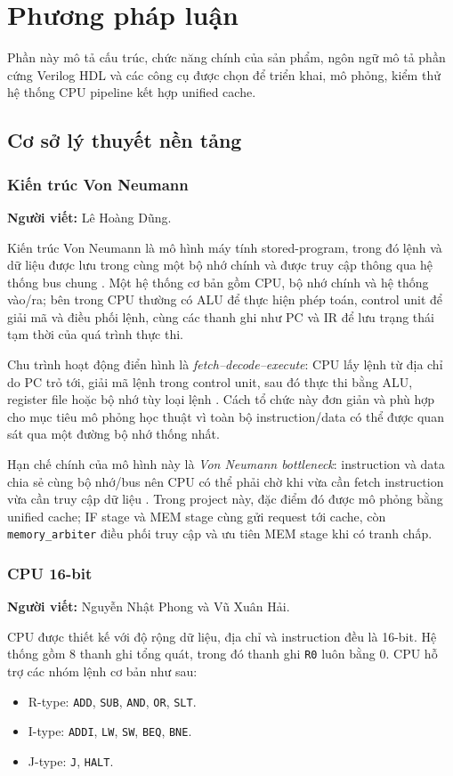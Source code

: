 \documentclass[11pt,a4paper]{article}
\theoremstyle{definition}
\theoremstyle{remark}
\begin{document}
	\section{Phương pháp luận}
	Phần này mô tả cấu trúc, chức năng chính của sản phẩm, ngôn ngữ mô tả phần cứng Verilog HDL và các công cụ được chọn để triển khai, mô phỏng, kiểm thử hệ thống CPU pipeline kết hợp unified cache.
	\subsection{Cơ sở lý thuyết nền tảng}
	
	\subsubsection{Kiến trúc Von Neumann}
	\textbf{Người viết:} Lê Hoàng Dũng.
	
	Kiến trúc Von Neumann là mô hình máy tính stored-program, trong đó lệnh và dữ liệu được lưu trong cùng một bộ nhớ chính và được truy cập thông qua hệ thống bus chung \cite{vonneumann,patterson}. Một hệ thống cơ bản gồm CPU, bộ nhớ chính và hệ thống vào/ra; bên trong CPU thường có ALU để thực hiện phép toán, control unit để giải mã và điều phối lệnh, cùng các thanh ghi như PC và IR để lưu trạng thái tạm thời của quá trình thực thi.
	
	Chu trình hoạt động điển hình là \textit{fetch--decode--execute}: CPU lấy lệnh từ địa chỉ do PC trỏ tới, giải mã lệnh trong control unit, sau đó thực thi bằng ALU, register file hoặc bộ nhớ tùy loại lệnh \cite{patterson}. Cách tổ chức này đơn giản và phù hợp cho mục tiêu mô phỏng học thuật vì toàn bộ instruction/data có thể được quan sát qua một đường bộ nhớ thống nhất.
	
	Hạn chế chính của mô hình này là \textit{Von Neumann bottleneck}: instruction và data chia sẻ cùng bộ nhớ/bus nên CPU có thể phải chờ khi vừa cần fetch instruction vừa cần truy cập dữ liệu \cite{hennessy}. Trong project này, đặc điểm đó được mô phỏng bằng unified cache; IF stage và MEM stage cùng gửi request tới cache, còn \texttt{memory\_arbiter} điều phối truy cập và ưu tiên MEM stage khi có tranh chấp.
	
	\subsubsection{CPU 16-bit}
	\textbf{Người viết:} Nguyễn Nhật Phong và Vũ Xuân Hải.
	
	CPU được thiết kế với độ rộng dữ liệu, địa chỉ và instruction đều là 16-bit. Hệ thống gồm 8 thanh ghi tổng quát, trong đó thanh ghi \texttt{R0} luôn bằng 0. CPU hỗ trợ các nhóm lệnh cơ bản như sau:
	\begin{itemize}
		\item R-type: \texttt{ADD}, \texttt{SUB}, \texttt{AND}, \texttt{OR}, \texttt{SLT}.
		\item I-type: \texttt{ADDI}, \texttt{LW}, \texttt{SW}, \texttt{BEQ}, \texttt{BNE}.
		\item J-type: \texttt{J}, \texttt{HALT}.
	\end{itemize}
	
\end{document}
